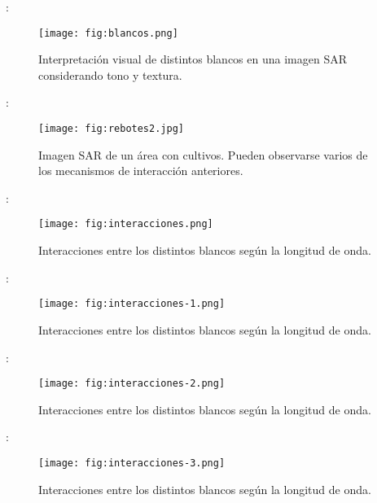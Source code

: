 \begin{frame}{\secname : \subsecname}
    \begin{figure}
      \centering
      \texttt{[image: fig:blancos.png]}
      \caption{Interpretación visual de distintos blancos en una imagen SAR considerando tono y textura.}
      \label{}
    \end{figure}
\end{frame}

\begin{frame}{\secname : \subsecname}
    \begin{figure}
      \centering
      \texttt{[image: fig:rebotes2.jpg]}
      \caption{Imagen SAR de un área con cultivos. Pueden observarse varios de los mecanismos de interacción anteriores.}
      \label{}
    \end{figure}
\end{frame}

\begin{frame}{\secname : \subsecname}
    \begin{figure}
      \centering
      \texttt{[image: fig:interacciones.png]}
      \caption{Interacciones entre los distintos blancos según la longitud de onda.}
      \label{}
    \end{figure}
\end{frame}

\begin{frame}{\secname : \subsecname}
    \begin{figure}
      \centering
      \texttt{[image: fig:interacciones-1.png]}
      \caption{Interacciones entre los distintos blancos según la longitud de onda.}
      \label{}
    \end{figure}
\end{frame}

\begin{frame}{\secname : \subsecname}
    \begin{figure}
      \centering
      \texttt{[image: fig:interacciones-2.png]}
      \caption{Interacciones entre los distintos blancos según la longitud de onda.}
      \label{}
    \end{figure}
\end{frame}

\begin{frame}{\secname : \subsecname}
    \begin{figure}
      \centering
      \texttt{[image: fig:interacciones-3.png]}
      \caption{Interacciones entre los distintos blancos según la longitud de onda.}
      \label{}
    \end{figure}
\end{frame}

